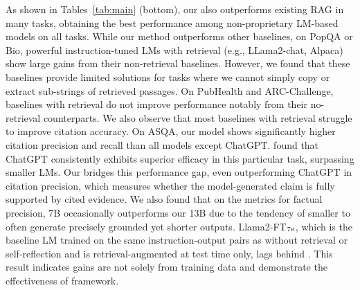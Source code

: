 As shown in Tables~\ref{tab:main} (bottom), our \model also outperforms existing RAG in many tasks, obtaining the best performance among non-proprietary LM-based models on all tasks. 
While our method outperforms other baselines, on PopQA or Bio, powerful instruction-tuned LMs with retrieval (e.g., LLama2-chat, Alpaca) show large gains from their non-retrieval baselines. 
However, we found that these baselines provide limited solutions for tasks where we cannot simply copy or extract sub-strings of retrieved passages. 
On PubHealth and ARC-Challenge, baselines with retrieval do not improve performance notably from their no-retrieval counterparts.
We also observe that most baselines with retrieval struggle to improve citation accuracy. 
On ASQA, our model shows significantly higher citation precision and recall than all models except ChatGPT. 
\citet{gao2023enabling} found that ChatGPT consistently exhibits superior efficacy in this particular task, surpassing smaller LMs. 
{
Our \model bridges this performance gap, even outperforming ChatGPT in citation precision, which measures whether the model-generated claim is fully supported by cited evidence. } 
We also found that on the metrics for factual precision, \model 7B occasionally outperforms our 13B due to the tendency of smaller \model to often generate precisely grounded yet shorter outputs. 
{
Llama2-FT$_{\textsc{7b}}$, which is the baseline LM trained on the same instruction-output pairs as \model without retrieval or self-reflection and is retrieval-augmented at test time only, lags behind \model. This result indicates \model gains are not solely from training data and demonstrate the effectiveness of \model framework.  } 



